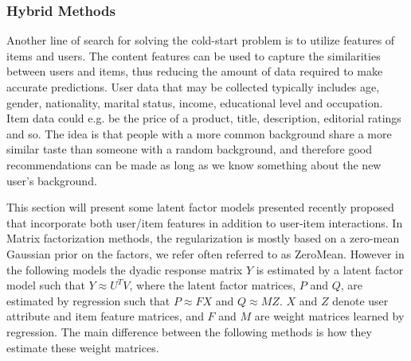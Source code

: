 \subsubsection{Hybrid Methods}


Another line of search for solving the cold-start problem is to utilize features of items and users. The content features can be used to capture the similarities between users and items, thus reducing the amount of data required to make accurate predictions. User data that may be collected typically includes age, gender, nationality, marital status, income, educational level and occupation. Item data could e.g. be the price of a product, title, description, editorial ratings and so. The idea is that people with a more common background share a more similar taste than someone with a random background, and therefore good recommendations can be made as long as we know something about the new user’s background.

This section will present some latent factor models presented recently proposed that incorporate both user/item features in addition to user-item interactions. In Matrix factorization methods, the regularization is mostly based on a
zero-mean Gaussian prior on the factors, we refer often referred to as ZeroMean. However in the following models the dyadic response matrix $Y$ is estimated by a latent factor model such that $Y \approx U^{T}V$, where the latent factor matrices, $P$ and $Q$, are estimated by regression such that $P \approx FX$ and $Q \approx MZ$. $X$ and $Z$ denote user attribute and item feature matrices, and $F$ and $M$ are weight matrices learned by regression. The main difference between the following methods is how they estimate these weight matrices.


